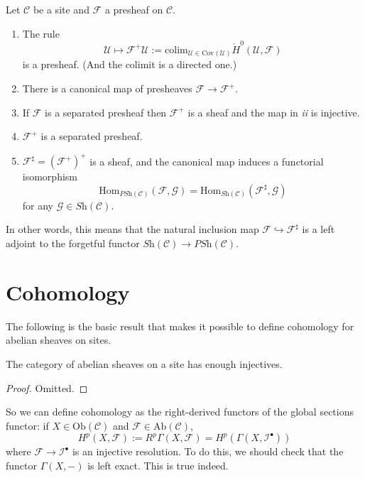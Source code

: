 \begin{theorem}
\label{theorem-sheafification}
Let $\mathcal{C}$ be a site and $\mathcal{F}$ a presheaf on $\mathcal{C}$.
\begin{enumerate}
\item The rule
$$
\mathcal{U} \mapsto \mathcal{F}^+ \mathcal{U} := \text{colim}_{\mathcal{U} \in 
\text{Cov}(\mathcal{U})} \check H^0(\mathcal{U}, \mathcal{F})
$$
is a presheaf. (And the colimit is a directed one.)
\item There is a canonical map of presheaves $\mathcal{F} \to \mathcal{F}^+$.
\item If $\mathcal{F}$ is a separated presheaf then $\mathcal{F}^+$ is a sheaf 
and the map in {\it ii} is injective.
\item $\mathcal{F}^+$ is a separated presheaf.
\item $\mathcal{F}^\sharp = (\mathcal{F}^+)^+$ is a sheaf, and the canonical 
map induces a functorial isomorphism
$$ 
\text{Hom}_{\textit{PSh}(\mathcal{C})}(\mathcal{F}, \mathcal{G}) = 
\text{Hom}_{\textit{Sh}(\mathcal{C})}(\mathcal{F}^\sharp,\mathcal{G})
$$ 
for any $\mathcal{G} \in \textit{Sh}(\mathcal{C})$.
\end{enumerate}
\end{theorem}

\noindent
In other words, this means that the natural inclusion map $\mathcal{F} 
\hookrightarrow \mathcal{F}^\sharp$ is a left adjoint to the forgetful functor 
$\textit{Sh}(\mathcal{C}) \to \textit{PSh}(\mathcal{C})$.




\section{Cohomology}
\label{section-cohomology}

\noindent
The following is the basic result that makes it possible to define cohomology
for abelian sheaves on sites.

\begin{theorem}
\label{theorem-enough-injectives}
The category of abelian sheaves on a site has enough injectives.
\end{theorem}

\begin{proof}
Omitted.
\end{proof}

\noindent
So we can define cohomology as the right-derived functors of the global 
sections functor: if $X \in \text{Ob}(\mathcal{C})$ and $\mathcal{F} \in 
\text{Ab}(\mathcal{C})$, 
$$
H^p(X,\mathcal{F}) := R^p \Gamma (X, \mathcal{F}) = H^p (\Gamma(X, 
\mathcal{I}^\bullet))
$$
where $\mathcal{F} \to \mathcal{I}^\bullet$ is an injective resolution. To do 
this, we should check that the functor $\Gamma (X, -)$ is left exact. This is 
true indeed.




